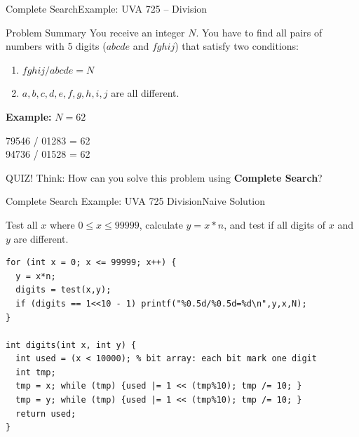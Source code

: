 \begin{frame}{Complete Search}{Example: UVA 725 -- Division}
  \begin{block}{Problem Summary}
    You receive an integer $N$. You have to find all pairs of numbers with 5 digits ($abcde$ and $fghij$) that satisfy two conditions:
    \begin{enumerate}
      \item $fghij / abcde = N$
      \item $a,b,c,d,e,f,g,h,i,j$ are all different.
    \end{enumerate}
  \end{block}\bigskip

  {\bf Example:} $N = 62$
  \medskip

  79546 / 01283 = 62\\
  94736 / 01528 = 62\\
  \bigskip

  \begin{alertblock}{QUIZ!}
    Think: How can you solve this problem using {\bf Complete Search}?
  \end{alertblock}
\end{frame}

\begin{frame}[fragile]{Complete Search Example: UVA 725 Division}{Naive Solution}
  \begin{block}{}
    Test all $x$ where $0 \leq x \leq 99999$, calculate $y = x*n$, and test if all digits of $x$ and $y$ are different.
  \end{block}

{\smaller
\begin{verbatim}
for (int x = 0; x <= 99999; x++) {
  y = x*n;
  digits = test(x,y);
  if (digits == 1<<10 - 1) printf("%0.5d/%0.5d=%d\n",y,x,N);
}

int digits(int x, int y) {
  int used = (x < 10000); % bit array: each bit mark one digit
  int tmp;
  tmp = x; while (tmp) {used |= 1 << (tmp%10); tmp /= 10; }
  tmp = y; while (tmp) {used |= 1 << (tmp%10); tmp /= 10; }
  return used;
}
\end{verbatim}
  }
\end{frame}


